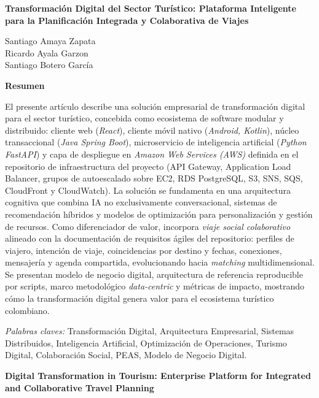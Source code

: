 \documentclass[12pt, letterpaper]{article}
\begin{document}
\begin{center}
\textbf{Transformación Digital del Sector Turístico: Plataforma Inteligente para la Planificación Integrada y Colaborativa de Viajes}
\end{center}

\begin{flushright}
\vspace{1em}
Santiago Amaya Zapata\\
Ricardo Ayala Garzon\\
Santiago Botero García
\end{flushright}

\vspace{1em}
\noindent\textbf{Resumen}

El presente artículo describe una solución empresarial de transformación digital para el sector turístico, concebida como ecosistema de software modular y distribuido: cliente web (\textit{React}), cliente móvil nativo (\textit{Android, Kotlin}), núcleo transaccional (\textit{Java Spring Boot}), microservicio de inteligencia artificial (\textit{Python FastAPI}) y capa de despliegue en \textit{Amazon Web Services (AWS)} definida en el repositorio de infraestructura del proyecto (API Gateway, Application Load Balancer, grupos de autoescalado sobre EC2, RDS PostgreSQL, S3, SNS, SQS, CloudFront y CloudWatch). La solución se fundamenta en una arquitectura cognitiva que combina IA no exclusivamente conversacional, sistemas de recomendación híbridos y modelos de optimización para personalización y gestión de recursos. Como diferenciador de valor, incorpora \textit{viaje social colaborativo} alineado con la documentación de requisitos ágiles del repositorio: perfiles de viajero, intención de viaje, coincidencias por destino y fechas, conexiones, mensajería y agenda compartida, evolucionando hacia \textit{matching} multidimensional. Se presentan modelo de negocio digital, arquitectura de referencia reproducible por scripts, marco metodológico \textit{data-centric} y métricas de impacto, mostrando cómo la transformación digital genera valor para el ecosistema turístico colombiano.

\textit{Palabras claves:} Transformación Digital, Arquitectura Empresarial, Sistemas Distribuidos, Inteligencia Artificial, Optimización de Operaciones, Turismo Digital, Colaboración Social, PEAS, Modelo de Negocio Digital.

\vspace{2em}
\begin{center}
\textbf{Digital Transformation in Tourism: Enterprise Platform for Integrated and Collaborative Travel Planning}
\end{center}
\end{document}
